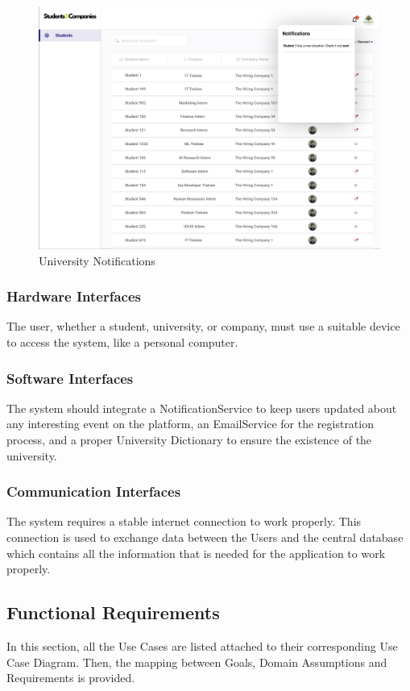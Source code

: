 \documentclass{article}
\begin{document}
\begin{figure}[H]
    \centering
    \includegraphics[scale = 0.40]{figures/UserInterfaces/University/University Notifications.png}
    \caption{University Notifications}
     \centering
\end{figure}
\subsubsection{Hardware Interfaces}
    The user, whether a student, university, or company, must use a suitable device to access the system, like a personal computer.
\subsubsection{Software Interfaces}
The system should integrate a NotificationService to keep users updated about any interesting event on
the platform, an EmailService for the registration process, and a proper University Dictionary to ensure the existence of the university.
\subsubsection{Communication Interfaces}
    The system requires a stable internet connection to work properly. This connection is used
    to exchange data between the Users and the central database which contains all the information that is needed for the application to work properly.
\subsection{Functional Requirements}
In this section, all the Use Cases are listed attached to their corresponding Use Case Diagram.
Then, the mapping between Goals, Domain Assumptions and Requirements is provided.
\end{document}
